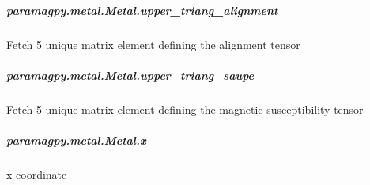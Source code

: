 \documentclass[a4paper,10pt,english]{sphinxmanual}
\begin{document}
\begin{fulllineitems}
\begin{fulllineitems}
\begin{fulllineitems}
\end{fulllineitems}



\subparagraph{paramagpy.metal.Metal.upper\_triang\_alignment}
\label{\detokenize{reference/generated/paramagpy.metal.Metal.upper_triang_alignment:paramagpy-metal-metal-upper-triang-alignment}}\label{\detokenize{reference/generated/paramagpy.metal.Metal.upper_triang_alignment::doc}}

\begin{fulllineitems}
\label{\detokenize{reference/generated/paramagpy.metal.Metal.upper_triang_alignment:paramagpy.metal.Metal.upper_triang_alignment}}
Fetch 5 unique matrix element defining the alignment tensor

\end{fulllineitems}



\subparagraph{paramagpy.metal.Metal.upper\_triang\_saupe}
\label{\detokenize{reference/generated/paramagpy.metal.Metal.upper_triang_saupe:paramagpy-metal-metal-upper-triang-saupe}}\label{\detokenize{reference/generated/paramagpy.metal.Metal.upper_triang_saupe::doc}}

\begin{fulllineitems}
\label{\detokenize{reference/generated/paramagpy.metal.Metal.upper_triang_saupe:paramagpy.metal.Metal.upper_triang_saupe}}
Fetch 5 unique matrix element defining the magnetic
susceptibility tensor

\end{fulllineitems}



\subparagraph{paramagpy.metal.Metal.x}
\label{\detokenize{reference/generated/paramagpy.metal.Metal.x:paramagpy-metal-metal-x}}\label{\detokenize{reference/generated/paramagpy.metal.Metal.x::doc}}

\begin{fulllineitems}
\label{\detokenize{reference/generated/paramagpy.metal.Metal.x:paramagpy.metal.Metal.x}}
x coordinate

\end{fulllineitems}




\end{fulllineitems}
\end{fulllineitems}
\end{document}
